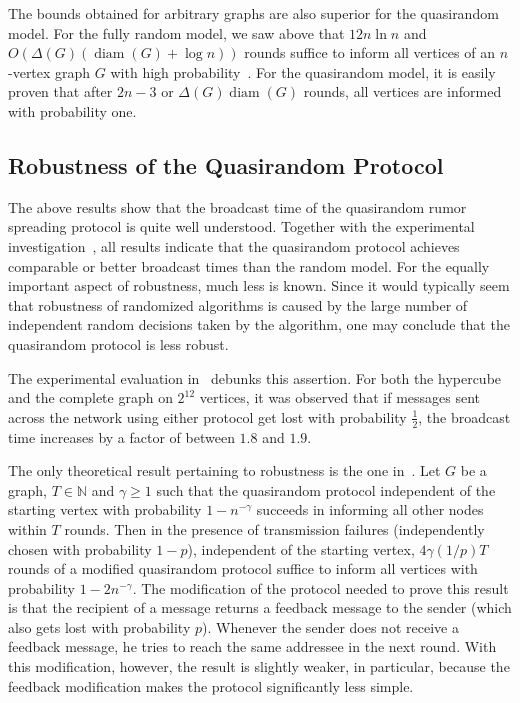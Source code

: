 \documentclass[12pt]{article}
\DeclareMathOperator{\diam}{diam}
\newcommand{\N}{{\mathbb{N}}}
\begin{document}
{The bounds obtained for arbitrary graphs are also superior for the quasirandom model. For the fully random model, we saw above that $12 n \ln n$ and $O(\Delta(G) (\diam(G) + \log n ))$ rounds suffice to inform all vertices of an $n$-vertex graph $G$ with high probability~\cite{FPRU90}. For the quasirandom model, it is easily proven that after $2n -3$ or $\Delta(G) \diam(G)$ rounds, all vertices are informed with probability one. 

\subsection{Robustness of the Quasirandom Protocol}

The above results show that the broadcast time of the quasirandom rumor spreading protocol is quite well understood. Together with the experimental investigation~\cite{DFKS09}, all results indicate that the quasirandom protocol achieves comparable or better broadcast times than the random model. For the equally important aspect of robustness, much less is known. Since it would typically seem that robustness of randomized algorithms is caused by the large number of independent random decisions taken by the algorithm, one may conclude that the quasirandom protocol is less robust. 

The experimental evaluation in~\cite{DFKS09} debunks this assertion. For both the hypercube and the complete graph on $2^{12}$ vertices, it was observed that if messages sent across the network using either protocol get lost with probability $\frac 12$, the broadcast time increases by a factor of between $1.8$ and $1.9$. 

The only theoretical result pertaining to robustness is the one in~\cite{DFS09}. Let $G$ be a graph, $T \in \N$ and $\gamma \ge 1$ such that the quasirandom protocol independent of the starting vertex with probability $1 - n^{-\gamma}$ succeeds in informing all other nodes within $T$ rounds. Then in the presence of transmission failures (independently chosen with probability $1-p$), independent of the starting vertex, $4 \gamma (1/p) T$ rounds of a modified quasirandom protocol suffice to inform all vertices with probability $1 - 2n^{-\gamma}$. The modification of the protocol needed to prove this result is that the recipient of a message returns a feedback message to the sender (which also gets lost with probability $p$). Whenever the sender does not receive a feedback message, he tries to reach the same addressee in the next round. With this modification, however, the result is slightly weaker, in particular, because the feedback modification makes the protocol significantly less simple.

}
\end{document}
